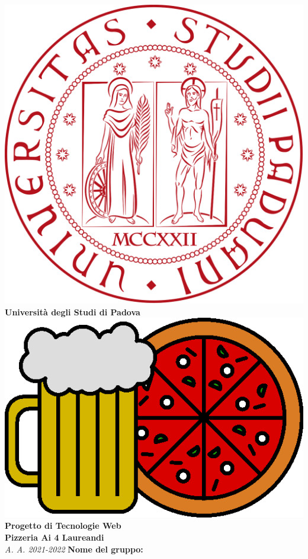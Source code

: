\begin{center}
	\includegraphics[scale=0.05]{resources/logo_unipd.png}\\
	\bigskip
	\textbf{Università degli Studi di Padova}\\
	\vfill
	\includegraphics[scale=0.275]{resources/logo.png}
	\vfill
	\huge 
	\textbf{Progetto di Tecnologie Web\\Pizzeria Ai 4 Laureandi}\\
	\bigskip
	\large
	\textit{A. A. 2021-2022}
	\vfill
	\textbf{Nome del gruppo:}\\

\end{center}
